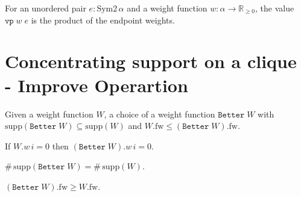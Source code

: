 

\begin{definition}\label{def:vp}
For an unordered pair $e: \mathrm{Sym2}\,\alpha$ and a weight function $w: \alpha \to \mathbb{R}_{\ge 0}$, the value $\texttt{vp}\;w\;e$ is the product of the endpoint weights.
\end{definition}

\section{Concentrating support on a clique - Improve Operartion}

\begin{definition}\label{def:Better}
Given a weight function $W$, a choice of a weight function $\texttt{Better}\;W$ with $\mathrm{supp}(\texttt{Better}\;W)\subseteq\mathrm{supp}(W)$ and $W.\mathrm{fw}\le (\texttt{Better}\;W).\mathrm{fw}$.
\end{definition}

\begin{lemma}\label{lem:Better_support_included}
If $W.w\,i=0$ then $(\texttt{Better}\;W).w\,i=0$.
\end{lemma}

\begin{lemma}\label{lem:Better_support_size}
$\#\,\mathrm{supp}(\texttt{Better}\;W)=\#\,\mathrm{supp}(W)$.
\end{lemma}

\begin{lemma}\label{lem:Better_non_decr}
$(\texttt{Better}\;W).\mathrm{fw}\ge W.\mathrm{fw}$.
\end{lemma}

